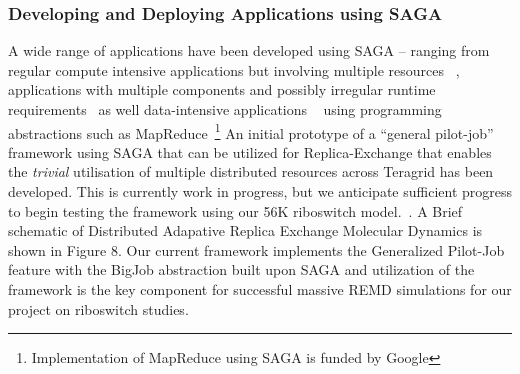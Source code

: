 \documentclass[a4paper,10pt]{article}
\begin{document}
\subsubsection*{Developing and Deploying Applications using SAGA}

A wide range of applications have been developed using SAGA -- ranging from regular compute intensive applications but involving multiple resources ~\cite{saga_escience07, gmac, REMD-PhilTranA2009}, applications with multiple components and possibly irregular runtime requirements~\cite{saga_loosely_coupled, teragrid08} as well data-intensive applications ~\cite{saga_data_intensive, saga_grid_cloud} using programming abstractions such as MapReduce~\footnote{Implementation of MapReduce using SAGA is funded by Google} An initial prototype of a ``general pilot-job'' framework using SAGA that can be utilized for Replica-Exchange that enables the {\it trivial} utilisation of multiple distributed resources across Teragrid has been developed. This is currently work in progress, but we anticipate sufficient progress to begin testing the framework using our 56K riboswitch model.~\cite{REMD-PhilTranA2009}. A Brief schematic of Distributed Adapative Replica Exchange Molecular Dynamics is shown in Figure 8.  Our current framework implements the Generalized Pilot-Job feature with the BigJob abstraction built upon SAGA and utilization of the framework is the key component for successful massive REMD simulations for our project on riboswitch studies.

\end{document}
